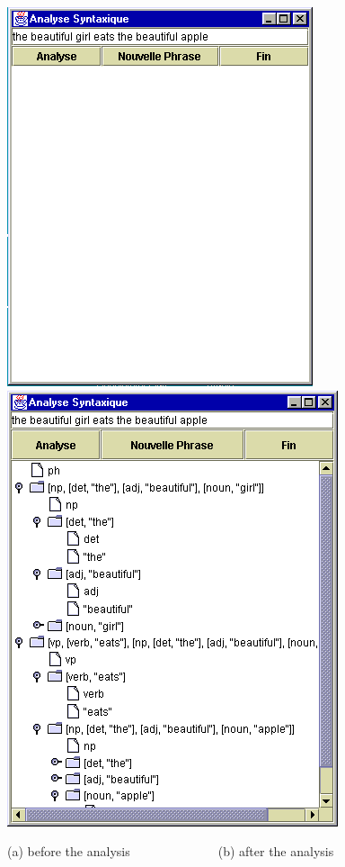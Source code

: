 \documentclass{book}
\begin{document}
\begin{htmlonly}

\begin{figure}
\begin{center}
\includegraphics{AnalSynt1.png}
\includegraphics{AnalSynt2.png}
\end{center}
\caption{\label{AnalySynt12}(a) before the analysis~~~~~~~~~~~~~~(b)
after the analysis}
\end{figure}

\end{htmlonly}
\end{document}
